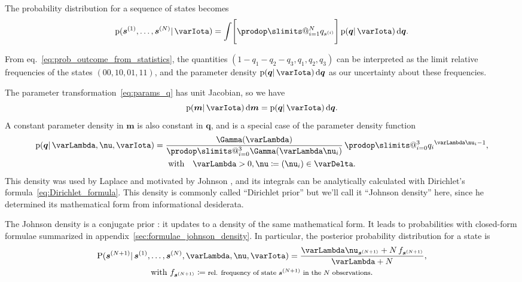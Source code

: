 \documentclass[\ifafour a4paper,12pt,\else a5paper,10pt,\fi%
onecolumn,oneside,article,%
british%
]{memoir}
\makeatletter
\theoremstyle{remark}
\theoremstyle{innote}
\def\prod{\DOTSI\prodop\slimits@}
\newcommand*{\citey}{\parencites*}
\renewcommand*{\cites}{\parencites}
\newcommand*{\di}{\mathrm{d}}%
\newcommand*{\defd}{\coloneqq}
\newcommand*{\pf}{\mathrm{p}}%
\newcommand*{\p}{\mathrm{P}}%
\renewcommand*{\|}{\mathpunct{|}}
\newcommand*{\chap}{ch.}%
\newcommand*{\eqn}{eq.}%
\newcommand*{\yI}{\varIota}
\newcommand*{\ys}{\bm{s}}
\newcommand*{\yso}[1]{\ys^{(#1)}}
\newcommand*{\ysso}[1]{s^{(#1)}}
\newcommand*{\yt}{\bm{m}}
\newcommand*{\yq}{\bm{q}}
\newcommand*{\yql}{q_{3}}
\newcommand*{\ym}{\bm{m}}
\newcommand*{\yN}{\varLambda}
\newcommand*{\ynn}{\nu}
\newcommand*{\yn}{\bm{\nu}}
\newcommand*{\simpl}{\varDelta}
\newcommand*{\yff}{f}
\makeatother
\begin{document}
The probability distribution for a sequence of states becomes
\begin{equation}
  \label{eq:predictive_q}
  \pf(\yso{1}, \dotsc, \yso{N} \|\yI )
=\int
\Biggl[  \prod_{i=1}^{N} q_{\ysso{i}} \Biggr]\,
  \pf(\yq \| \yI)\,\di\yq. 
\end{equation}

From \eqn~\eqref{eq:prob_outcome_from_statistics}, the quantities
$(1-q_1-q_2-\yql, q_1, q_2, \yql)$ can be interpreted as the limit relative
frequencies of the states $(00,10,01,11)$, and the parameter density
$\pf(\yq\|\yI)\,\di\yq$ as our uncertainty about these frequencies.

The parameter transformation~\eqref{eq:params_q} has unit Jacobian, so we have
\begin{equation}
  \label{eq:equiv_priors_m_q}
  \pf(\yt \|\yI)\,\di\yt = \pf(\yq \|\yI)\,\di\yq.
\end{equation}
A constant parameter density in $\ym$ is also constant in $\yq$, and is a
special case of the parameter density function
\begin{equation}
  \label{eq:johnson-dirichlet}
  \begin{gathered}
  \pf(\yq \|\yN,\yn, \yI) =
  \frac{\Gamma(\yN)}{\prod_{i=0}^3 \Gamma(\yN\ynn_i)}\,
  \prod_{i=0}^3{q_i}^{\yN\ynn_i-1},\\
\text{with}\quad \yN>0, \yn \defd (\ynn_i) \in \simpl.
\end{gathered}
\end{equation}
This density was used by Laplace \citey{laplace1778_r1781} and motivated by
Johnson \citey{johnson1924,johnson1932c}, and its integrals can be
analytically calculated with Dirichlet's \citey{dirichlet1839}
formula~\eqref{eq:Dirichlet_formula}. This density is commonly called
\enquote{Dirichlet prior}
\cites(see)()[\chap~4]{good1965}{zabell1982,jaynes1986d_r1996,guptaetal2001}
but we'll call it \enquote{Johnson density} here, since he determined its
mathematical form from informational desiderata.

The Johnson density is a conjugate prior
\cites[\chap~9]{degroot1970_r2004}{diaconisetal1979b}: it updates to a
density of the same mathematical form. It leads to probabilities with
closed-form formulae summarized in
appendix~\ref{sec:formulae_johnson_density}. In particular, the posterior
probability distribution for a state is
\newlength{\myl}\settowidth{\myl}{\footnotesize in the $N$ observations}
\begin{equation}
  \label{eq:predictive_q_general}
\begin{gathered}
  \p(\yso{N+1} \| \yso{1}, \dotsc, \yso{N}, \yN, \yn,\yI) =
  \frac{\yN\ynn_{\yso{N+1}} + N\,\yff_{\yso{N+1}}}{\yN+N},
  \\\text{with }
  \yff_{\yso{N+1}} \defd \text{\footnotesize rel. frequency of state $\yso{N+1}$ in
  the $N$ observations}.
\end{gathered}
\end{equation}
\end{document}

